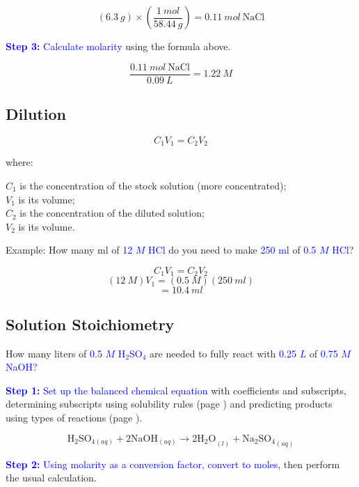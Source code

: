 \documentclass[a4paper, 12pt]{article}
\begin{document}
$$(6.3 \: g) \times \left(\frac{1 \: mol}{58.44 \: g}\right) = 0.11 \: mol \: \text{NaCl}$$

\textcolor{blue}{\textbf{Step 3:} Calculate molarity} using the formula above.

$$\frac{0.11 \: mol \: \text{NaCl}}{0.09 \: L} = 1.22 \: M$$


\subsection*{Dilution}

$$C_1V_1 = C_2V_2$$

where:

$C_1$ is the concentration of the stock solution (more concentrated);\\
$V_1$ is its volume;\\
$C_2$ is the concentration of the diluted solution;\\
$V_2$ is its volume.

Example: How many ml of \textcolor{blue}{12 $M$ HCl} do you need to make \textcolor{blue}{250 ml} of \textcolor{blue}{0.5 $M$ HCl}?

$$C_1V_1 = C_2V_2$$
$$(12\: M)V_1 = (0.5 \: M)(250 \: ml)$$
$$ = \boxed{10.4 \: ml}$$

\subsection*{Solution Stoichiometry}
How many liters of \textcolor{blue}{0.5 $M$ H$_2$SO$_4$} are needed to fully react with \textcolor{blue}{0.25 $L$} of \textcolor{blue}{0.75 $M$ NaOH?}

\textcolor{blue}{\textbf{Step 1:} Set up the balanced chemical equation} with coefficients and subscripts, determining subscripts using solubility rules (page \pageref{solubility rules}) and predicting products using types of reactions (page \pageref{types of reactions}).

$$\text{H}_2\text{SO}_{4(aq)} + 2\text{NaOH}_{(aq)} \longrightarrow 2\text{H$_2$O}_{(l)} + \text{Na$_2$SO$_4$}_{(aq)}$$

\textcolor{blue}{\textbf{Step 2:} Using molarity as a conversion factor, convert to moles}, then perform the usual calculation.
\end{document}
